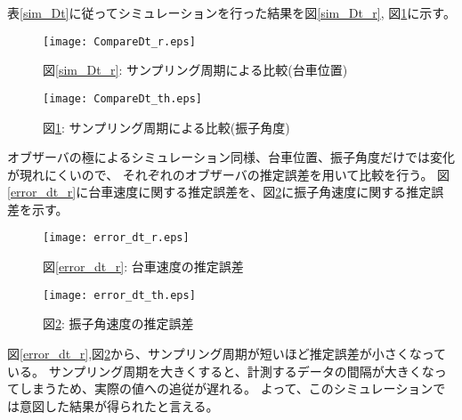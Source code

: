 表\ref{sim_Dt}に従ってシミュレーションを行った結果を図\ref{sim_Dt_r}, 図\ref{sim_Dt_th}に示す。

\begin{figure}[htbp]
    \begin{minipage}{0.5\hsize}
        \begin{center}
            \texttt{[image: CompareDt\_r.eps]}
            \caption{図\ref{sim_Dt_r}: サンプリング周期による比較(台車位置)}
            \label{sim_Dt_r}
        \end{center}
    \end{minipage}
    \begin{minipage}{0.5\hsize}
        \begin{center}
            \texttt{[image: CompareDt\_th.eps]}
            \caption{図\ref{sim_Dt_th}: サンプリング周期による比較(振子角度)}
            \label{sim_Dt_th}
        \end{center}
    \end{minipage}
\end{figure}

オブザーバの極によるシミュレーション同様、台車位置、振子角度だけでは変化が現れにくいので、
それぞれのオブザーバの推定誤差を用いて比較を行う。
図\ref{error_dt_r}に台車速度に関する推定誤差を、図\ref{error_dt_th}に振子角速度に関する推定誤差を示す。

\begin{figure}[htbp]
    \begin{minipage}{0.5\hsize}
        \begin{center}
            \texttt{[image: error\_dt\_r.eps]}
            \caption{図\ref{error_dt_r}: 台車速度の推定誤差}
            \label{error_dt_r}
        \end{center}
    \end{minipage}
    \begin{minipage}{0.5\hsize}
        \begin{center}
            \texttt{[image: error\_dt\_th.eps]}
            \caption{図\ref{error_dt_th}: 振子角速度の推定誤差}
            \label{error_dt_th}
        \end{center}
    \end{minipage}
\end{figure}

図\ref{error_dt_r},図\ref{error_dt_th}から、サンプリング周期が短いほど推定誤差が小さくなっている。
サンプリング周期を大きくすると、計測するデータの間隔が大きくなってしまうため、実際の値への追従が遅れる。
よって、このシミュレーションでは意図した結果が得られたと言える。


